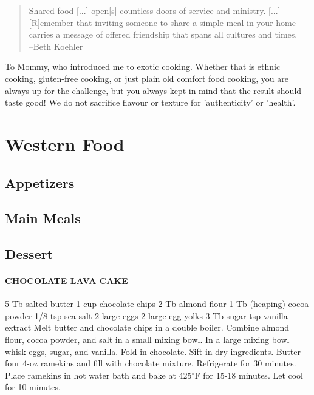 \documentclass[oneside,11pt]{memoir} %
\begin{document}
\begin{quote}
Shared food [...] open[s] countless doors of service and ministry. [...] [R]emember that inviting someone to share a simple meal in your home carries a message of offered friendship that spans all cultures and times.\\
--Beth Koehler
\end{quote}

To Mommy, who introduced me to exotic cooking. Whether that is ethnic cooking, gluten-free cooking, or just plain old comfort food cooking, you are always up for the challenge, but you always kept in mind that the result should taste good! We do not sacrifice flavour or texture for 'authenticity' or 'health'.


\part{Western Food}

\chapter{Appetizers}
\chapter{Main Meals}
\chapter{Dessert}

\subsection{CHOCOLATE LAVA CAKE}  
	5 Tb salted butter	1 cup chocolate chips
	2 Tb almond flour	1 Tb (heaping) cocoa powder
	1/8 tsp sea salt	2 large eggs
	2 large egg yolks	3 Tb sugar
	 tsp vanilla extract	
Melt butter and chocolate chips in a double boiler. Combine almond flour, cocoa powder, and salt in a small mixing bowl. In a large mixing bowl whisk eggs, sugar, and vanilla. Fold in chocolate. Sift in dry ingredients. Butter four 4-oz ramekins and fill with chocolate mixture. Refrigerate for 30 minutes. Place ramekins in hot water bath and bake at 425$^\circ$F for 15-18 minutes. Let cool for 10 minutes.
\end{document}
